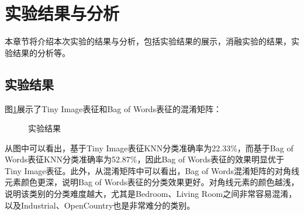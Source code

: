\section{实验结果与分析}

本章节将介绍本次实验的结果与分析，包括实验结果的展示，消融实验的结果，实验结果的分析等。

\subsection{实验结果}

图\ref{fig:result}展示了Tiny Image表征和Bag of Words表征的混淆矩阵：

\begin{figure}[H]
    \centering
    \caption{实验结果}
    \label{fig:result}
\end{figure}

从图中可以看出，基于Tiny Image表征KNN分类准确率为22.33\%，而基于Bag of Words表征KNN分类准确率为52.87\%，因此Bag of Words表征的效果明显优于Tiny Image表征。此外，从混淆矩阵中可以看出，Bag of Words混淆矩阵的对角线元素颜色更深，说明Bag of Words表征的分类效果更好。对角线元素的颜色越浅，说明该类别的分类难度越大，尤其是Bedroom、Living Room之间非常容易混淆，以及Industrial、OpenCountry也是非常难分的类别。

